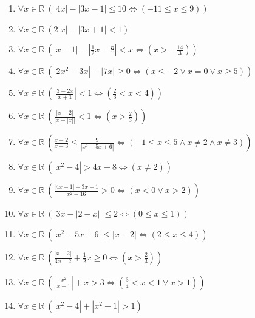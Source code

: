 \documentclass[11pt,a4paper]{article}
\begin{document}
\begin{enumerate}
\item $\displaystyle \forall x \in \mathbb{R}\ \left( \left|4x\right| - \left|3x - 1\right| \le 10 \iff \left( -11 \le x \le 9 \right) \right)$
\item $\displaystyle \forall x \in \mathbb{R}\ \left( 2\left|x\right| - \left|3x + 1\right| < 1 \right)$
\item $\displaystyle \forall x \in \mathbb{R}\ \left( \left|x - 1\right| - \left|\frac{1}{2}x - 8\right| < x \iff \left( x > -\frac{14}{3} \right) \right)$
\item $\displaystyle \forall x \in \mathbb{R}\ \left( \left|2x^{2} - 3x\right| - \left|7x\right| \ge 0 \iff \left( x \le -2 \lor x = 0 \lor x \ge 5 \right) \right)$
\item $\displaystyle \forall x \in \mathbb{R}\ \left( \left|\frac{3 - 2x}{x + 1}\right| < 1 \iff \left( \frac{2}{3} < x < 4 \right) \right)$
\item $\displaystyle \forall x \in \mathbb{R}\ \left( \frac{\left|x - 2\right|}{\left|x + \left|x\right|\right|} < 1 \iff \left( x > \frac{2}{3} \right) \right)$
\item $\displaystyle \forall x \in \mathbb{R}\ \left( \frac{x - 2}{x - 3} \le \frac{9}{\left|x^{2} - 5x + 6\right|} \iff \left( -1 \le x \le 5 \land x \neq 2 \land x \neq 3 \right) \right)$
\item $\displaystyle \forall x \in \mathbb{R}\ \left( \left|x^{2} - 4\right| > 4x - 8 \iff \left( x \neq 2 \right) \right)$
\item $\displaystyle \forall x \in \mathbb{R}\ \left( \frac{\left|4x - 1\right| - 3x - 1}{x^{2} + 16} > 0 \iff \left( x < 0 \lor x > 2 \right) \right)$
\item $\displaystyle \forall x \in \mathbb{R}\ \left( \left|3x - \left|2 - x\right|\right| \le 2 \iff \left( 0 \le x \le 1 \right) \right)$
\item $\displaystyle \forall x \in \mathbb{R}\ \left( \left|x^{2} - 5x + 6\right| \le \left|x - 2\right| \iff \left( 2 \le x \le 4 \right) \right)$
\item $\displaystyle \forall x \in \mathbb{R}\ \left( \frac{\left|x + 2\right|}{3x - 2} + \frac{1}{2}x \ge 0 \iff \left( x > \frac{2}{3} \right) \right)$
\item $\displaystyle \forall x \in \mathbb{R}\ \left( \left|\frac{x^{2}}{x - 1}\right| + x > 3 \iff \left( \frac{3}{4} < x < 1 \lor x > 1 \right) \right)$
\item $\displaystyle \forall x \in \mathbb{R}\ \left( \left|x^{2} - 4\right| + \left|x^{2} - 1\right| > 1 \right)$

\end{enumerate}
\end{document}
